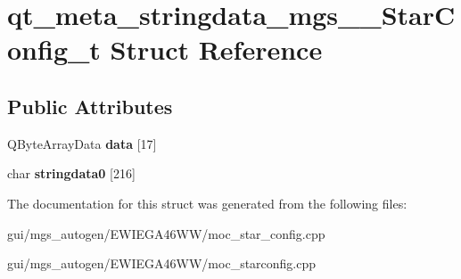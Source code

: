 \hypertarget{structqt__meta__stringdata__mgs____StarConfig__t}{}\section{qt\+\_\+meta\+\_\+stringdata\+\_\+mgs\+\_\+\+\_\+\+Star\+Config\+\_\+t Struct Reference}
\label{structqt__meta__stringdata__mgs____StarConfig__t}
\subsection*{Public Attributes}
\begin{DoxyCompactItemize}
\item 
\mbox{\label{structqt__meta__stringdata__mgs____StarConfig__t_ab14aa3cad21319f115b2467a97eaead1}} 
Q\+Byte\+Array\+Data {\bfseries data} \mbox{[}17\mbox{]}
\item 
\mbox{\label{structqt__meta__stringdata__mgs____StarConfig__t_ac5bfa20eb1e0de20368200a4d89c61f2}} 
char {\bfseries stringdata0} \mbox{[}216\mbox{]}
\end{DoxyCompactItemize}


The documentation for this struct was generated from the following files\+:\begin{DoxyCompactItemize}
\item 
gui/mgs\+\_\+autogen/\+E\+W\+I\+E\+G\+A46\+W\+W/moc\+\_\+star\+\_\+config.\+cpp\item 
gui/mgs\+\_\+autogen/\+E\+W\+I\+E\+G\+A46\+W\+W/moc\+\_\+starconfig.\+cpp\end{DoxyCompactItemize}
